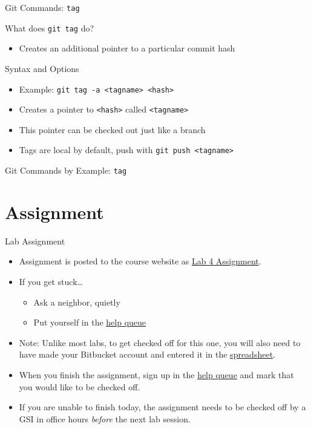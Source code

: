 \documentclass[table,dvipsnames]{beamer}
\begin{document}
\begin{frame}{Git Commands: \texttt{tag}}
	\begin{block}{What does \texttt{git tag} do?}
		\begin{itemize}
			\item Creates an additional pointer to a particular commit hash
		\end{itemize}
	\end{block}
	\begin{block}{Syntax and Options}
		\begin{itemize}
			\item Example: \texttt{git tag -a <tagname> <hash>}
			\item Creates a pointer to \texttt{<hash>} called \texttt{<tagname>}
			\item This pointer can be checked out just like a branch
			\item Tags are local by default, push with \texttt{git push
				<tagname>}
		\end{itemize}
	\end{block}
\end{frame}


\begin{frame}{Git Commands by Example: \texttt{tag}}
\end{frame}

\section{Assignment}
\begin{frame}[fragile]{Lab Assignment}
	\begin{itemize}
		\item Assignment is posted to the course website as 
			\href{http://www.eecs.umich.edu/eecs/courses/eecs470/labs/eecs470lab4assignment.pdf}{Lab
			4 Assignment}.
		\item If you get stuck\dots
			\begin{itemize}
				\item Ask a neighbor, quietly
				\item Put yourself in the 
					\href{https://oh.eecs.umich.edu/course_queues/403}{help queue}
			\end{itemize}
		\item Note: Unlike most labs, to get checked off for this one, you will
			also need to have made your Bitbucket account and entered it in the 
			\href{https://docs.google.com/spreadsheets/d/12jaY-aVehBuwxI1VhCA-kbMJyKsYOYu4JGXDU-4EdQs/edit?usp=sharing}{spreadsheet}.
		\item When you finish the assignment, sign up in the
			\href{https://oh.eecs.umich.edu/course_queues/403}{help queue}
			and mark that you would like to be checked off.
		\item If you are unable to finish today, the assignment needs to be
			checked off by a GSI in office hours \emph{before} the next lab
			session.
	\end{itemize}
\end{frame}
\end{document}
